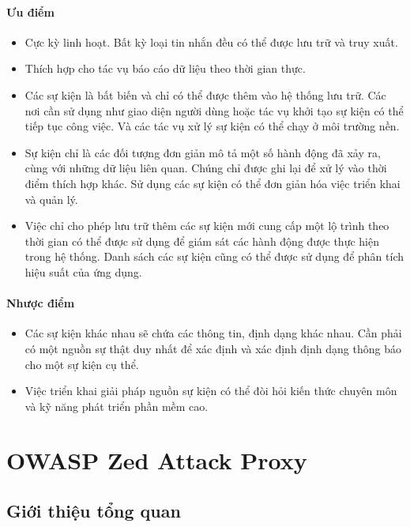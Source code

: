 \paragraph{Ưu điểm}

\begin{itemize}
    \item Cực kỳ linh hoạt. Bất kỳ loại tin nhắn đều có thể được lưu trữ và truy xuất.
    \item Thích hợp cho tác vụ báo cáo dữ liệu theo thời gian thực.
    \item Các sự kiện là bất biến và chỉ có thể được thêm vào hệ thống lưu trữ. Các nơi cần sử dụng như giao diện người dùng hoặc tác vụ khởi tạo sự kiện có thể tiếp tục công việc. Và các tác vụ xử lý sự kiện có thể chạy ở môi trường nền.
    \item Sự kiện chỉ là các đối tượng đơn giản mô tả một số hành động đã xảy ra, cùng với những dữ liệu liên quan. Chúng chỉ được ghi lại để xử lý vào thời điểm thích hợp khác. Sử dụng các sự kiện có thể đơn giản hóa việc triển khai và quản lý.
    \item Việc chỉ cho phép lưu trữ thêm các sự kiện mới cung cấp một lộ trình theo thời gian có thể được sử dụng để giám sát các hành động được thực hiện trong hệ thống. Danh sách các sự kiện cũng có thể được sử dụng để phân tích hiệu suất của ứng dụng.
\end{itemize}

\paragraph{Nhược điểm}

\begin{itemize}
    \item Các sự kiện khác nhau sẽ chứa các thông tin, định dạng khác nhau. Cần phải có một nguồn sự thật duy nhất để xác định và xác định định dạng thông báo cho một sự kiện cụ thể.
    \item Việc triển khai giải pháp nguồn sự kiện có thể đòi hỏi kiến thức chuyên môn và kỹ năng phát triển phần mềm cao.
\end{itemize}

\section{OWASP Zed Attack Proxy}

\subsection{Giới thiệu tổng quan}

